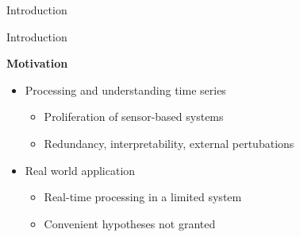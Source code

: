 \documentclass[9pt,t,aspectratio=1610]{beamer}
\begin{document}
\begin{frame}{Introduction}
\begin{minipage}[t]{\linewidth}
\begin{minipage}[t]{0.5\linewidth}
\begin{figure}[h]
        \end{figure}
    \end{minipage}
\end{minipage}
\end{frame}

\begin{frame}{Introduction}{}
\begin{minipage}[t]{\linewidth}
    \textbf{Motivation}
    \begin{itemize}
        \item Processing and understanding time series
        \begin{itemize}
            \item Proliferation of sensor-based systems
            \item Redundancy, interpretability, external pertubations
        \end{itemize}
        \item Real world application
        \begin{itemize}
            \item Real-time processing in a limited system
            \item Convenient hypotheses not granted
        \end{itemize}
    \end{itemize}
\end{minipage}


\end{frame}
\end{document}
